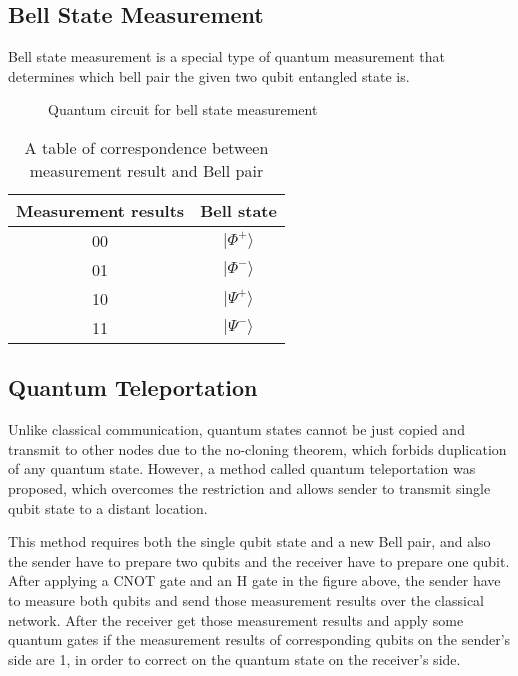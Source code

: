 \subsection{Bell State Measurement}
Bell state measurement is a special type of quantum measurement that determines which bell pair the given two qubit entangled state is.
\begin{figure}[ht]
  \begin{center}
\caption{Quantum circuit for bell state measurement}
\end{center}
\end{figure}

\begin{table}[ht]
  \begin{center}
    \begin{tabular}{|c|c|} \hline
      Measurement results & Bell state \\ \hline \cline{1-2}
      00 &  $|\Phi^+\rangle$ \\ \cline{1-2}
      01 & $|\Phi^-\rangle$ \\  \cline{1-2}
      10 &  $|\Psi^+\rangle$ \\ \cline{1-2}
      11 & $|\Psi^-\rangle$ \\  \hline  \cline{1-2}
    \end{tabular}
    \caption{A table of correspondence between measurement result and Bell pair}
  \end{center}
\end{table}

\subsection{Quantum Teleportation}

Unlike classical communication, quantum states cannot be just copied and transmit to other nodes due to the no-cloning theorem, which forbids duplication of any quantum state.  However, a method called quantum teleportation was proposed, which overcomes the restriction and allows sender to transmit single qubit state to a distant location. 
 		
This method requires both the single qubit state and a new Bell pair, and also the sender have to prepare two qubits and the receiver have to prepare one qubit.  After applying a CNOT gate and an H gate in the figure above, the sender have to measure both qubits and send those measurement results over the classical network.  After the receiver get those measurement results and apply some quantum gates if the measurement results of corresponding qubits on the sender's side are 1, in order to correct on the quantum state on the receiver's side.

